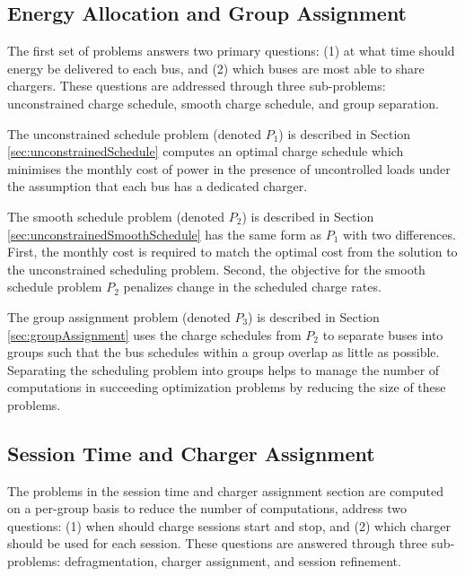 \subsection{Energy Allocation and Group Assignment} 
\par The first set of problems answers two primary questions: (1) at what time should energy be delivered to each bus, and (2) which buses are most able to share chargers.  These questions are addressed through three sub-problems: unconstrained charge schedule, smooth charge schedule, and group separation.  
\par The unconstrained schedule problem (denoted $P_1$) is described in Section \ref{sec:unconstrainedSchedule} computes an optimal charge schedule which minimises the monthly cost of power in the presence of uncontrolled loads under the assumption that each bus has a dedicated charger.  
\par The smooth schedule problem (denoted $P_2$) is described in Section \ref{sec:unconstrainedSmoothSchedule} has the same form as $P_1$ with two differences.  First, the monthly cost is required to match the optimal cost from the solution to the unconstrained scheduling problem. Second, the objective for the smooth schedule problem $P_2$ penalizes change in the scheduled charge rates.
\par The group assignment problem (denoted $P_3$) is described in Section \ref{sec:groupAssignment} uses the charge schedules from $P_2$ to separate buses into groups such that the bus schedules within a group overlap as little as possible.  Separating the scheduling problem into groups helps to manage the number of computations in succeeding optimization problems by reducing the size of these problems.

\subsection{Session Time and Charger Assignment} 
The problems in the session time and charger assignment section are computed on a per-group basis to reduce the number of computations, address two questions: (1) when should charge sessions start and stop, and (2) which charger should be used for each session.  These questions are answered through three sub-problems: defragmentation, charger assignment, and session refinement.

